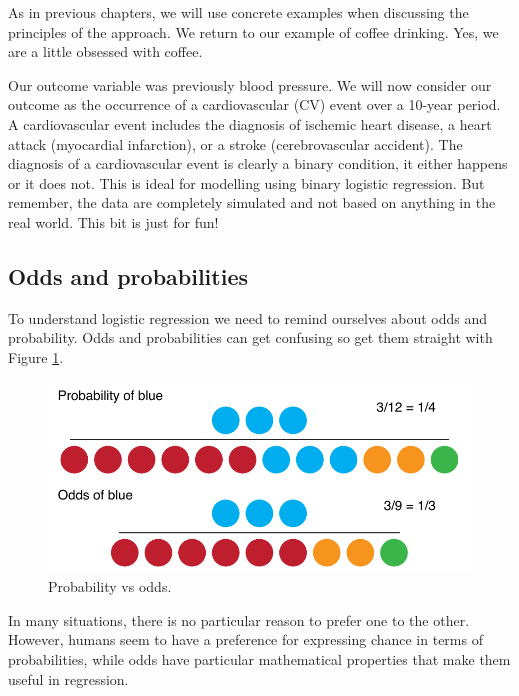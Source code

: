 \documentclass[
  12pt,
  krantz2]{krantz}
\begin{document}
As in previous chapters, we will use concrete examples when discussing the principles of the approach.
We return to our example of coffee drinking.
Yes, we are a little obsessed with coffee.

Our outcome variable was previously blood pressure.
We will now consider our outcome as the occurrence of a cardiovascular (CV) event over a 10-year period.
A cardiovascular event includes the diagnosis of ischemic heart disease, a heart attack (myocardial infarction), or a stroke (cerebrovascular accident).
The diagnosis of a cardiovascular event is clearly a binary condition, it either happens or it does not.
This is ideal for modelling using binary logistic regression.
But remember, the data are completely simulated and not based on anything in the real world.
This bit is just for fun!

\hypertarget{odds-and-probabilities}{%
\subsection{Odds and probabilities}\label{odds-and-probabilities}}


To understand logistic regression we need to remind ourselves about odds and probability.
Odds and probabilities can get confusing so get them straight with Figure \ref{fig:chap09-fig-odds}.

\begin{figure}
\centering
\includegraphics{images/chapter09/0_odds.pdf}
\caption{\label{fig:chap09-fig-odds}Probability vs odds.}
\end{figure}

In many situations, there is no particular reason to prefer one to the other.
However, humans seem to have a preference for expressing chance in terms of probabilities, while odds have particular mathematical properties that make them useful in regression.
\end{document}
